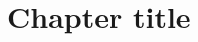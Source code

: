 \documentclass[main.tex]{subfiles}
\begin{document}
\chapter{Chapter title}
\Blindtext

\ifSubfilesClassLoaded{

}{}
\end{document}
